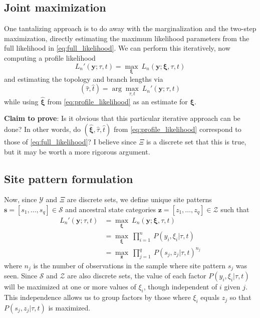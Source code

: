 \documentclass[a4paper]{article}
\begin{document}
\subsection{Joint maximization}

One tantalizing approach is to do away with the marginalization and the two-step maximization, directly estimating the maximum likelihood parameters from the full likelihood in \eqref{eq:full_likelihood}.
We can perform this iteratively, now computing a profile likelihood
\begin{equation}
\label{eq:profile_likelihood}
L_n'(\mathbf{y};\tau, t) = \max_{\boldsymbol\xi} \ L_n(\mathbf{y};\boldsymbol\xi, \tau, t)
\end{equation}
and estimating the topology and branch lengths via
$$
(\hat{\tau}, \hat{t}) = \arg\max_{\tau, t} \ L_n'(\mathbf{y};\tau, t)
$$
while using $\hat{\boldsymbol\xi}$ from \eqref{eq:profile_likelihood} as an estimate for $\boldsymbol\xi$.

\textbf{Claim to prove}: Is it obvious that this particular iterative approach can be done?
In other words, do $(\hat{\boldsymbol\xi}, \hat{\tau}, \hat{t})$ from \eqref{eq:profile_likelihood} correspond to those of \eqref{eq:full_likelihood}?
I believe since $\Xi$ is a discrete set that this is true, but it may be worth a more rigorous argument.

\subsection{Site pattern formulation}

Now, since $\mathcal{Y}$ and $\Xi$ are discrete sets, we define unique site patterns $\mathbf{s}=[s_1,\ldots,s_q]\in\mathcal{S}$ and ancestral state categories $\mathbf{z}=[z_1,\ldots,z_q]\in\mathcal{Z}$ such that
\begin{align}
L_n'(\mathbf{y};\tau, t) &= \max_{\boldsymbol\xi} \ L_n(\mathbf{y};\boldsymbol\xi, \tau, t) \\
    &= \max_{\boldsymbol\xi} \ \prod_{i=1}^{n} \ P(y_i, \xi_i | \tau, t) \\
    &= \max_{\mathbf{z}} \ \prod_{j=1}^{q} \ P(s_j, z_j | \tau, t)^{n_j} \label{eq:site_pattern_likelihood}
\end{align}
where $n_j$ is the number of observations in the sample where site pattern $s_j$ was seen.
Since $\mathcal{S}$ and $\mathcal{Z}$ are also discrete sets, the value of each factor $P(y_i, \xi_i | \tau, t)$ will be maximized at one or more values of $\xi_i$, though independent of $i$ given $j$.
This independence allows us to group factors by those where $\xi_i$ equals $z_j$ so that $P(s_j, z_j | \tau, t)$ is maximized.
\end{document}

